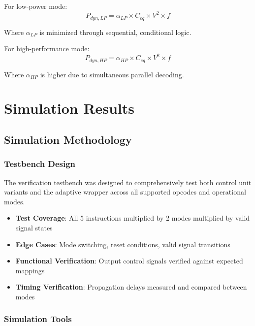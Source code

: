 \documentclass[15pt,a4paper]{report}
\begin{document}
For low-power mode:
\begin{equation}
P_{dyn,LP} = \alpha_{LP} \times C_{eq} \times V^2 \times f
\end{equation}

Where $\alpha_{LP}$ is minimized through sequential, conditional logic.

For high-performance mode:
\begin{equation}
P_{dyn,HP} = \alpha_{HP} \times C_{eq} \times V^2 \times f
\end{equation}

Where $\alpha_{HP}$ is higher due to simultaneous parallel decoding.

\newpage

\chapter{Simulation Results}

\section{Simulation Methodology}

\subsection{Testbench Design}

The verification testbench was designed to comprehensively test both control unit variants and the adaptive wrapper across all supported opcodes and operational modes.

\begin{itemize}
    \item \textbf{Test Coverage}: All 5 instructions multiplied by 2 modes multiplied by valid signal states
    
    \item \textbf{Edge Cases}: Mode switching, reset conditions, valid signal transitions
    
    \item \textbf{Functional Verification}: Output control signals verified against expected mappings
    
    \item \textbf{Timing Verification}: Propagation delays measured and compared between modes
\end{itemize}

\subsection{Simulation Tools}
\end{document}
